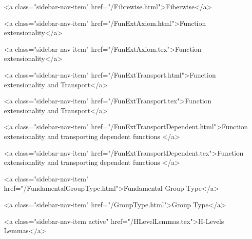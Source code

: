       
    
      
        
          <a class="sidebar-nav-item" href="/Fibrewise.html">Fiberwise</a>
        
      
    
      
        
          <a class="sidebar-nav-item" href="/FunExtAxiom.html">Function extensionality</a>
        
      
    
      
        
          <a class="sidebar-nav-item" href="/FunExtAxiom.tex">Function extensionality</a>
        
      
    
      
        
          <a class="sidebar-nav-item" href="/FunExtTransport.html">Function extensionality and Transport</a>
        
      
    
      
        
          <a class="sidebar-nav-item" href="/FunExtTransport.tex">Function extensionality and Transport</a>
        
      
    
      
        
          <a class="sidebar-nav-item" href="/FunExtTransportDependent.html">Function extensionality and transporting dependent functions </a>
        
      
    
      
        
          <a class="sidebar-nav-item" href="/FunExtTransportDependent.tex">Function extensionality and transporting dependent functions </a>
        
      
    
      
        
          <a class="sidebar-nav-item" href="/FundamentalGroupType.html">Fundamental Group Type</a>
        
      
    
      
        
          <a class="sidebar-nav-item" href="/GroupType.html">Group Type</a>
        
      
    
      
        
          <a class="sidebar-nav-item active" href="/HLevelLemmas.tex">H-Levels Lemmas</a>
        
      
    
